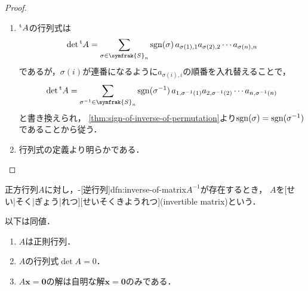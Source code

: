 \documentclass[../sotsu.tex]{subfiles}
\begin{document}
\begin{proof}
    \begin{enumerate}
        \item ${}^{\mathrm{t}}A$の行列式は
            \[  \det \tp{A} = \sum_{\sigma \in \symfrak{S}_n} \sgn(\sigma) \, a_{\sigma(1), 1} a_{\sigma(2), 2} \dotsm a_{\sigma(n), n}  \]
            であるが，$\sigma(i)$が連番になるように$a_{\sigma(i), i}$の順番を入れ替えることで，
            \[  \det \tp{A} = \sum_{\sigma^{-1} \in \symfrak{S}_n} \sgn(\sigma^{-1}) \, a_{1, \sigma^{-1}(1)} a_{2, \sigma^{-1}(2)} \dotsm a_{n, \sigma^{-1}(n)}  \]
            と書き換えられ，
            \cref{thm:sign-of-inverse-of-permutation}より$\operatorname{sgn}(\sigma) = \operatorname{sgn}(\sigma^{-1})$であることから従う．
        \item 行列式の定義より明らかである．
    \end{enumerate}
\end{proof}

\begin{definition}
    \label{dfn:invertible-matrix}
    正方行列$A$に対し，-[逆行列]{dfn:inverse-of-matrix}$A^{-1}$が存在するとき，
    $A$を[せい|そく|ぎょう|れつ][せいそくきようれつ](invertible matrix)という．
\end{definition}

\begin{proposition}
    以下は同値．
    \begin{enumerate}
        \item $A$は正則行列．
        \item $A$の行列式$\det A = 0$．
        \item $A \symbf{x} = \symbf{0}$の解は自明な解$\symbf{x} = \symbf{0}$のみである．
    \end{enumerate}
\end{proposition}
\end{document}
